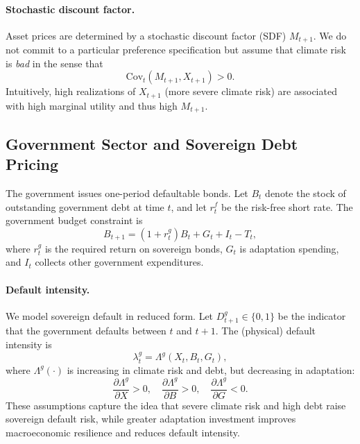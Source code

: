 \documentclass[12pt]{article}
\def\Cov{\mbox{Cov}}
\begin{document}
\paragraph{Stochastic discount factor.}
Asset prices are determined by a stochastic discount factor (SDF) $M_{t+1}$.
We do not commit to a particular preference specification but assume that
climate risk is \emph{bad} in the sense that
\begin{equation}
  \Cov_t(M_{t+1}, X_{t+1}) > 0.
  \label{eq:SDF_climate_cov}
\end{equation}
Intuitively, high realizations of $X_{t+1}$ (more severe climate risk) are
associated with high marginal utility and thus high $M_{t+1}$.

\subsection{Government Sector and Sovereign Debt Pricing}

The government issues one-period defaultable bonds. Let $B_t$ denote the
stock of outstanding government debt at time $t$, and let $r^f_t$ be the
risk-free short rate. The government budget constraint is
\begin{equation}
  B_{t+1} = (1 + r^g_t) B_t + G_t + I_t - T_t,
  \label{eq:gov_budget}
\end{equation}
where $r^g_t$ is the required return on sovereign bonds, $G_t$ is
adaptation spending, and $I_t$ collects other government expenditures.

\paragraph{Default intensity.}
We model sovereign default in reduced form. Let $D^g_{t+1} \in \{0,1\}$ be
the indicator that the government defaults between $t$ and $t+1$. The
(physical) default intensity is
\begin{equation}
  \lambda^g_t = \Lambda^g(X_t, B_t, G_t),
  \label{eq:lambda_g_def}
\end{equation}
where $\Lambda^g(\cdot)$ is increasing in climate risk and debt, but
decreasing in adaptation:
\begin{equation}
  \frac{\partial \Lambda^g}{\partial X} > 0, \quad
  \frac{\partial \Lambda^g}{\partial B} > 0, \quad
  \frac{\partial \Lambda^g}{\partial G} < 0.
  \label{eq:lambda_g_mono}
\end{equation}
These assumptions capture the idea that severe climate risk and high debt
raise sovereign default risk, while greater adaptation investment improves
macroeconomic resilience and reduces default intensity.
\end{document}
